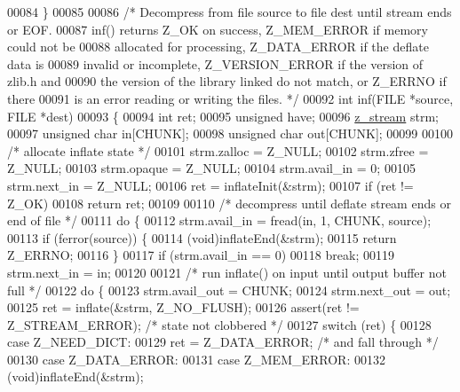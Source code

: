 \begin{DoxyCode}
00084 \}
00085 
00086 \textcolor{comment}{/* Decompress from file source to file dest until stream ends or EOF.}
00087 \textcolor{comment}{   inf() returns Z\_OK on success, Z\_MEM\_ERROR if memory could not be}
00088 \textcolor{comment}{   allocated for processing, Z\_DATA\_ERROR if the deflate data is}
00089 \textcolor{comment}{   invalid or incomplete, Z\_VERSION\_ERROR if the version of zlib.h and}
00090 \textcolor{comment}{   the version of the library linked do not match, or Z\_ERRNO if there}
00091 \textcolor{comment}{   is an error reading or writing the files. */}
00092 \textcolor{keywordtype}{int} inf(FILE *source, FILE *dest)
00093 \{
00094     \textcolor{keywordtype}{int} ret;
00095     \textcolor{keywordtype}{unsigned} have;
00096     \hyperlink{structz__stream__s}{z\_stream} strm;
00097     \textcolor{keywordtype}{unsigned} \textcolor{keywordtype}{char} in[CHUNK];
00098     \textcolor{keywordtype}{unsigned} \textcolor{keywordtype}{char} out[CHUNK];
00099 
00100     \textcolor{comment}{/* allocate inflate state */}
00101     strm.zalloc = Z\_NULL;
00102     strm.zfree = Z\_NULL;
00103     strm.opaque = Z\_NULL;
00104     strm.avail\_in = 0;
00105     strm.next\_in = Z\_NULL;
00106     ret = inflateInit(&strm);
00107     \textcolor{keywordflow}{if} (ret != Z\_OK)
00108         \textcolor{keywordflow}{return} ret;
00109 
00110     \textcolor{comment}{/* decompress until deflate stream ends or end of file */}
00111     \textcolor{keywordflow}{do} \{
00112         strm.avail\_in = fread(in, 1, CHUNK, source);
00113         \textcolor{keywordflow}{if} (ferror(source)) \{
00114             (void)inflateEnd(&strm);
00115             \textcolor{keywordflow}{return} Z\_ERRNO;
00116         \}
00117         \textcolor{keywordflow}{if} (strm.avail\_in == 0)
00118             \textcolor{keywordflow}{break};
00119         strm.next\_in = in;
00120 
00121         \textcolor{comment}{/* run inflate() on input until output buffer not full */}
00122         \textcolor{keywordflow}{do} \{
00123             strm.avail\_out = CHUNK;
00124             strm.next\_out = out;
00125             ret = inflate(&strm, Z\_NO\_FLUSH);
00126             assert(ret != Z\_STREAM\_ERROR);  \textcolor{comment}{/* state not clobbered */}
00127             \textcolor{keywordflow}{switch} (ret) \{
00128             \textcolor{keywordflow}{case} Z\_NEED\_DICT:
00129                 ret = Z\_DATA\_ERROR;     \textcolor{comment}{/* and fall through */}
00130             \textcolor{keywordflow}{case} Z\_DATA\_ERROR:
00131             \textcolor{keywordflow}{case} Z\_MEM\_ERROR:
00132                 (void)inflateEnd(&strm);

\end{DoxyCode}
